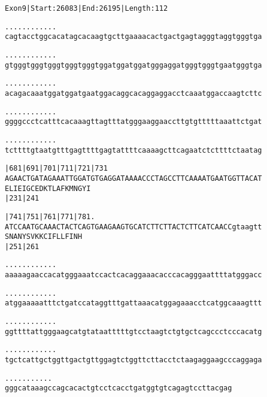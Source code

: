 \documentclass{article}
\begin{document}
\newpage
\begin{alltt}
Exon 9 | Start: 26083 | End: 26195 | Length: 112

.    .    .    .    .    .    .    .    .    .    .    .    
cagtacctggcacatagcacaagtgcttgaaaacactgactgagtagggtaggtgggtga

.    .    .    .    .    .    .    .    .    .    .    .    
gtgggtgggtgggtgggtgggtggatggatggatgggaggatgggtgggtgaatgggtga

.    .    .    .    .    .    .    .    .    .    .    .    
acagacaaatggatggatgaatggacaggcacaggaggacctcaaatggaccaagtcttc

.    .    .    .    .    .    .    .    .    .    .    .    
ggggccctcatttcacaaagttagtttatgggaaggaaccttgtgtttttaaattctgat

.    .    .    .    .    .    .    .    .    .    .    .    
tcttttgtaatgtttgagttttgagtattttcaaaagcttcagaatctcttttctaatag

   |681      |691      |701      |711      |721      |731   
AGAACTGATAGAAATTGGATGTGAGGATAAAACCCTAGCCTTCAAAATGAATGGTTACAT
 E  L  I  E  I  G  C  E  D  K  T  L  A  F  K  M  N  G  Y  I 
             |231                          |241             

   |741      |751      |761      |771      |781          .  
ATCCAATGCAAACTACTCAGTGAAGAAGTGCATCTTCTTACTCTTCATCAACCgtaagtt
 S  N  A  N  Y  S  V  K  K  C  I  F  L  L  F  I  N  H       
             |251                          |261             

  .    .    .    .    .    .    .    .    .    .    .    .  
aaaaagaaccacatgggaaatccactcacaggaaacacccacagggaattttatgggacc

  .    .    .    .    .    .    .    .    .    .    .    .  
atggaaaaatttctgatccataggtttgattaaacatggagaaacctcatggcaaagttt

  .    .    .    .    .    .    .    .    .    .    .    .  
ggttttattgggaagcatgtataatttttgtcctaagtctgtgctcagccctcccacatg

  .    .    .    .    .    .    .    .    .    .    .    .  
tgctcattgctggttgactgttggagtctggttcttacctctaagaggaagcccaggaga

  .    .    .    .    .    .    .    .    .    .    .
gggcataaagccagcacactgtcctcacctgatggtgtcagagtccttacgag
\end{alltt}
\newpage
\end{document}
